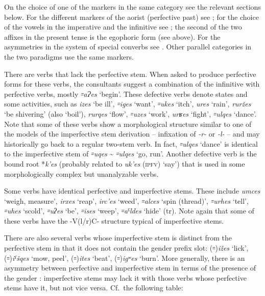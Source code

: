 \documentclass[output=paper]{langsci/langscibook}
\begin{document}
On the choice of one of the markers in the same category see the
relevant sections below. For the different markers of the aorist
(perfective past) see ; for the choice of the vowels in the
imperative and the infinitive see ; the second of the two
affixes in the present tense is the egophoric form (see  above).
For the asymmetries in the system of special converbs see \citet{sheyanova2019}.
Other parallel categories in the two paradigms use the same
markers.

There are verbs that lack the perfective stem. When asked to produce
perfective forms for these verbs, the consultants suggest a combination
of the infinitive with perfective verbs, mostly \emph{꞊aɁes} `begin'.
These defective verbs denote states and some  activities, such as
\emph{izes} `be ill', \emph{꞊iges} `want', \emph{꞊ukes} `itch',
\emph{ures} `rain', \emph{ruržes} `be shivering' (also `boil'),
\emph{rurqes} `flow', \emph{꞊uzes} `work', \emph{urʁes} `fight',
\emph{꞊ulqes} `dance'. Note that some of these verbs show a
morphological structure similar to one of the models of the imperfective
stem derivation – infixation of \emph{-r-} or \emph{-l-} – and may
historically go back to a regular two-stem verb. In fact, \emph{꞊ulqes}
`dance' is identical to the imperfective stem of \emph{꞊uqes}
\textasciitilde{} \emph{꞊ulqes} `go, run'. Another defective verb is the
bound root *\emph{k'es} (probably related to \emph{uk'es} (\textsc{ipfv}) `say')
that is used in some morphologically complex but unanalyzable verbs.

Some verbs have identical perfective and imperfective stems. These
include \emph{umces} `weigh, measure', \emph{irxes} `reap',
\emph{irc'es} `weed', \emph{꞊alces} `spin (thread)', \emph{꞊urhes}
`tell', \emph{꞊uhes} `scold', \emph{꞊uʔes} `be', \emph{꞊ises} `weep',
\emph{꞊aˤldes} `hide' (tr). Note again that some of these verbs have the
-V(l/r)C- structure typical of imperfective stems.

There are also several verbs whose imperfective stem is distinct from
the perfective stem in that it does not contain the gender prefix slot:
(꞊)\emph{ižes} `lick', (꞊)\emph{iˤšqes} `mow, peel', (꞊)\emph{ites}
`beat', (꞊)\emph{igʷes} `burn'. More generally, there is an asymmetry
between perfective and imperfective stem in terms of the presence of the
gender : imperfective stems may lack it with those verbs
whose perfective stems have it, but not vice versa. Cf.\ the following
table:
\end{document}
